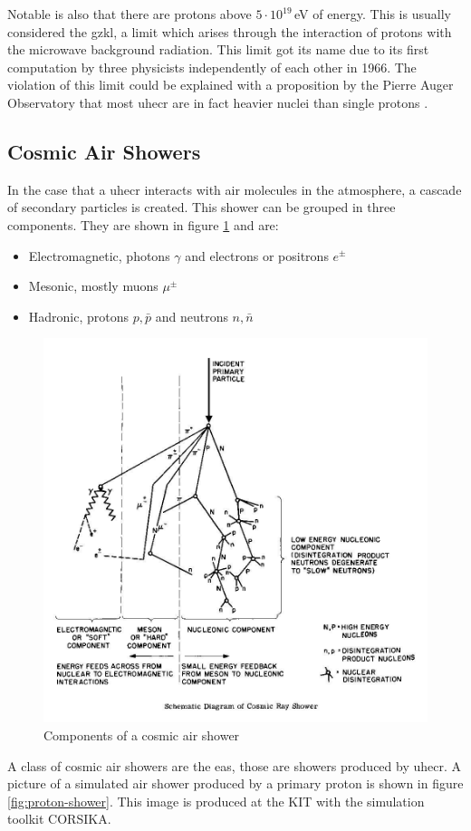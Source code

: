 \documentclass[abstract,toc,los,english,11pt,glossaries]{jluthesis}
\begin{document}
Notable is also that there are protons above $5\cdot10^{19}$\,eV of energy.
This is usually considered the \acrfull{gzkl}\cite{2021APh...12602526B}, a limit which arises through the interaction of protons with the microwave background radiation. This limit got its name due to its first computation by three physicists independently of each other in 1966. The violation of this limit could be explained with a proposition by the Pierre Auger Observatory that most \acrshort{uhecr} are in fact heavier nuclei than single protons \cite{thepierreaugercollaboration2017inferences}.

\subsection{Cosmic Air Showers}
In the case that a \acrshort{uhecr} interacts with air molecules in the atmosphere, a cascade of secondary particles is created. This shower can be grouped in three components. They are shown in figure \ref{fig:shower-components} and are:
\begin{itemize}
	\item Electromagnetic, photons $\gamma$ and electrons or positrons $e^\pm$
	\item Mesonic, mostly muons $\mu^\pm$
	\item Hadronic, protons $p,\bar{p}$ and neutrons $n,\bar{n}$
\end{itemize}
\begin{figure}[ht!]
	\centering
	\includegraphics[width=0.6\linewidth]{data/shower-components}
	\caption{ Components of a cosmic air shower \cite{desy-zeuthen}}
	\label{fig:shower-components}
\end{figure}
A class of cosmic air showers are the \acrfull{eas}, those are showers produced by \acrshort{uhecr}. A picture of a simulated air shower produced by a primary proton is shown in figure \ref{fig:proton-shower}. This image is produced at the KIT with the simulation toolkit CORSIKA. 
\end{document}
